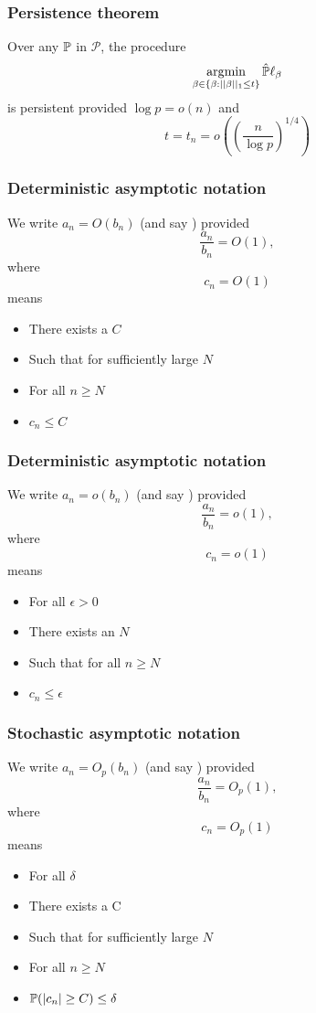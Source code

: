 \documentclass[12pt]{beamer}
\begin{document}
\begin{frame}
  \frametitle{Persistence theorem}
\begin{theorem}
Over any $\P$ in $\mathcal{P}$, the procedure
\[
\argmin_{\beta \in \{\beta: ||\beta||_1 \leq t\}} \hat{\P} \ell_\beta
\]
is persistent provided $\log p = o(n)$ and 
\[
t = t_n =  o\left( \left(\frac{n}{\log p} \right)^{1/4} \right)
\]
\end{theorem}

\end{frame}


\begin{frame}
  \frametitle{Deterministic asymptotic notation}
We write $a_n = O(b_n)$ (and say ) provided
\[
\frac{a_n}{b_n} = O(1),
\]
where 
\[
c_n = O(1) 
\]
means 
\begin{itemize}
\item There exists a $C$
\item Such that for sufficiently large $N$
\item For all $n \geq N$
\item $c_n \leq C$
\end{itemize}
\end{frame}

\begin{frame}
  \frametitle{Deterministic asymptotic notation}
We write $a_n = o(b_n)$ (and say ) provided
\[
\frac{a_n}{b_n} = o(1),
\]
where 
\[
c_n = o(1) 
\]
means 
\begin{itemize}
\item For all $\epsilon>0$
\item There exists an $N$
\item Such that for all $n \geq N$
\item $c_n \leq \epsilon$
\end{itemize}
\end{frame}

\begin{frame}
  \frametitle{Stochastic asymptotic notation}
We write $a_n = O_p(b_n)$ (and say ) provided
\[
\frac{a_n}{b_n} = O_p(1),
\]
where 
\[
c_n = O_p(1) 
\]
means 
\begin{itemize}
\item For all $\delta$
\item There exists a C
\item Such that for sufficiently large $N$
\item For all $n \geq N$
\item $\P(|c_n|  \geq C)\leq \delta$
\end{itemize}
\end{frame}
\end{document}

